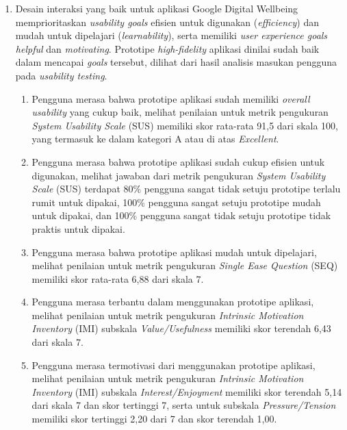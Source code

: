 \begin{enumerate}
  \item Desain interaksi yang baik untuk aplikasi Google Digital Wellbeing memprioritaskan \textit{usability goals} efisien untuk digunakan (\textit{efficiency}) dan mudah untuk dipelajari (\textit{learnability}), serta memiliki \textit{user experience goals} \textit{helpful} dan \textit{motivating}. Prototipe \textit{high-fidelity} aplikasi dinilai sudah baik dalam mencapai \textit{goals} tersebut, dilihat dari hasil analisis masukan pengguna pada \textit{usability testing}.
    \begin{enumerate}[label=\alph*.]
      \item Pengguna merasa bahwa prototipe aplikasi sudah memiliki \textit{overall usability} yang cukup baik, melihat penilaian untuk metrik pengukuran \textit{System Usability Scale} (SUS) memiliki skor rata-rata 91,5 dari skala 100, yang termasuk ke dalam kategori A atau di atas \textit{Excellent}. 
      
      \item Pengguna merasa bahwa prototipe aplikasi sudah cukup efisien untuk digunakan, melihat jawaban dari metrik pengukuran \textit{System Usability Scale} (SUS) terdapat 80\% pengguna sangat tidak setuju prototipe terlalu rumit untuk dipakai, 100\% pengguna sangat setuju prototipe mudah untuk dipakai, dan 100\% pengguna sangat tidak setuju prototipe tidak praktis untuk dipakai. 
      
      \item Pengguna merasa bahwa prototipe aplikasi mudah untuk dipelajari, melihat penilaian untuk metrik pengukuran \textit{Single Ease Question} (SEQ) memiliki skor rata-rata 6,88 dari skala 7.
      
      \item Pengguna merasa terbantu dalam menggunakan prototipe aplikasi, melihat penilaian untuk metrik pengukuran \textit{Intrinsic Motivation Inventory} (IMI) subskala \textit{Value/Usefulness} memiliki skor terendah 6,43 dari skala 7.
      
      \item Pengguna merasa termotivasi dari menggunakan prototipe aplikasi, melihat penilaian untuk metrik pengukuran \textit{Intrinsic Motivation Inventory} (IMI) subskala \textit{Interest/Enjoyment} memiliki skor terendah 5,14 dari skala 7 dan skor tertinggi 7, serta untuk subskala \textit{Pressure/Tension} memiliki skor tertinggi 2,20 dari 7 dan skor terendah 1,00.
        
    \end{enumerate}
    

\end{enumerate}
